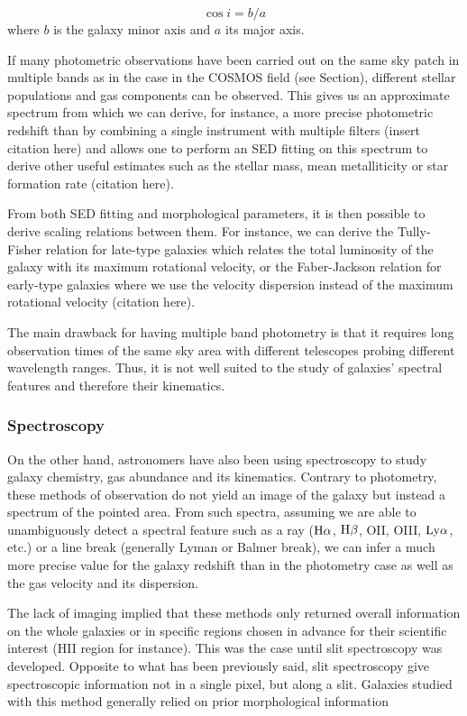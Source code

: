 \begin{equation}
	\cos i = b/a
	\label{eq:inclinaison}
\end{equation}
where $b$ is the galaxy minor axis and $a$ its major axis.

If many photometric observations have been carried out on the same sky patch in multiple bands as in the case in the COSMOS field (see Section), different stellar populations and gas components can be observed. This gives us an approximate spectrum from which we can derive, for instance, a more precise photometric redshift than by combining a single instrument with multiple filters (insert citation here) and allows one to perform an SED fitting on this spectrum to derive other useful estimates such as the stellar mass, mean metalliticity or star formation rate (citation here).

From both SED fitting and morphological parameters, it is then possible to derive scaling relations between them. For instance, we can derive the Tully-Fisher relation for late-type galaxies which relates the total luminosity of the galaxy with its maximum rotational velocity, or the Faber-Jackson relation for early-type galaxies where we use the velocity dispersion instead of the maximum rotational velocity (citation here).

The main drawback for having multiple band photometry is that it requires long observation times of the same sky area with different telescopes probing different wavelength ranges. Thus, it is not well suited to the study of galaxies' spectral features and therefore their kinematics.

\subsubsection{Spectroscopy}

On the other hand, astronomers have also been using spectroscopy to study galaxy chemistry, gas abundance and its kinematics. Contrary to photometry, these methods of observation do not yield an image of the galaxy but instead a spectrum of the pointed area. From such spectra, assuming we are able to unambiguously detect a spectral feature such as a ray ($\rm{H}{\alpha}$, $\rm{H}{\beta}$, OII, OIII, $\rm{Ly}\alpha$, etc.) or a line break (generally Lyman or Balmer break), we can infer a much more precise value for the galaxy redshift than in the photometry case as well as the gas velocity and its dispersion.

The lack of imaging implied that these methods only returned overall information on the whole galaxies or in specific regions chosen in advance for their scientific interest (HII region for instance). This was the case until slit spectroscopy was developed. Opposite to what has been previously said, slit spectroscopy give spectroscopic information not in a single pixel, but along a slit. Galaxies studied with this method generally relied on prior morphological information 

